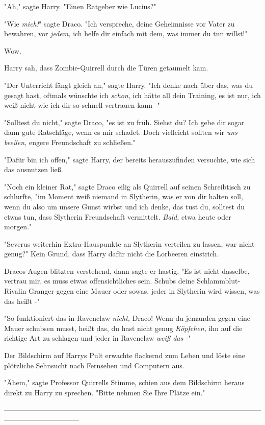 {"Ah," sagte Harry. "Einen Ratgeber wie Lucius?"

"Wie \emph{mich!}" sagte Draco. "Ich verspreche, deine Geheimnisse vor Vater zu bewahren, vor \emph{jedem,} ich helfe dir einfach mit dem, was immer du tun willst!"

Wow.

Harry sah, dass Zombie-Quirrell durch die Türen getaumelt kam.

"Der Unterricht fängt gleich an," sagte Harry. "Ich denke nach über das, was du gesagt hast, oftmals wünschte ich \emph{schon}, ich hätte all dein Training, es ist nur, ich weiß nicht wie ich dir so schnell vertrauen kann -"

"Solltest du nicht," sagte Draco, "es ist zu früh. Siehst du? Ich gebe dir sogar dann gute Ratschläge, wenn es mir schadet. Doch vielleicht sollten wir \emph{uns beeilen,} engere Freundschaft zu schließen."

"Dafür bin ich offen," sagte Harry, der bereits herauszufinden versuchte, wie sich das ausnutzen ließ.

"Noch ein kleiner Rat," sagte Draco eilig als Quirrell auf seinen Schreibtisch zu schlurfte, "im Moment weiß niemand in Slytherin, was er von dir halten soll, wenn du also um unsere Gunst wirbst und ich denke, das tust du, solltest du etwas tun, dass Slytherin Freundschaft vermittelt. \emph{Bald,} etwa heute oder morgen."

"Severus weiterhin Extra-Hauspunkte an Slytherin verteilen zu lassen, war nicht genug?" Kein Grund, dass Harry dafür nicht die Lorbeeren einstrich.

Dracos Augen blitzten verstehend, dann sagte er hastig, "Es ist nicht dasselbe, vertrau mir, es muss etwas offensichtliches sein. Schubs deine Schlammblut-Rivalin Granger gegen eine Mauer oder sowas, jeder in Slytherin wird wissen, was das heißt -"

"So funktioniert das in Ravenclaw \emph{nicht,} Draco! Wenn du jemanden gegen eine Mauer schubsen musst, heißt das, du hast nicht genug \emph{Köpfchen,} ihn auf die richtige Art zu schlagen und jeder in Ravenclaw \emph{weiß das -}"

Der Bildschirm auf Harrys Pult erwachte flackernd zum Leben und löste eine plötzliche Sehnsucht nach Fernsehen und Computern aus.

"Ähem," sagte Professor Quirrells Stimme, schien aus dem Bildschirm heraus direkt zu Harry zu sprechen. "Bitte nehmen Sie Ihre Plätze ein."

--------------------------------------------------------------------------------------------------------------------------------------------

}
